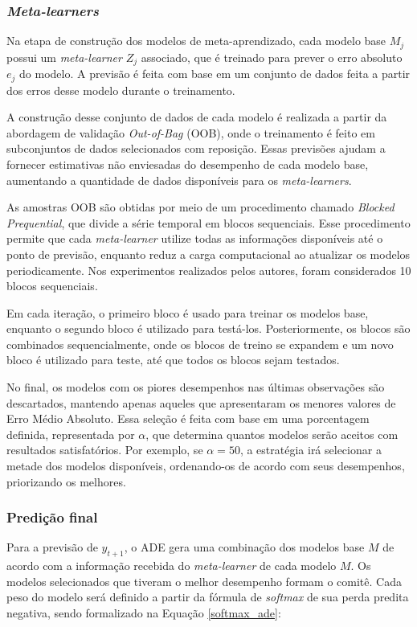 \subsubsection{\textit{Meta-learners}}

Na etapa de construção dos modelos de meta-aprendizado, cada modelo base \( M_j \) possui um \textit{meta-learner} \( Z_j \) associado, que é treinado para prever o erro absoluto \( e_j \) do modelo. A previsão é feita com base em um conjunto de dados feita a partir dos erros desse modelo durante o treinamento.

A construção desse conjunto de dados de cada modelo é realizada a partir da abordagem de validação \textit{Out-of-Bag} (OOB), onde o treinamento é feito em subconjuntos de dados selecionados com reposição. Essas previsões ajudam a fornecer estimativas não enviesadas do desempenho de cada modelo base, aumentando a quantidade de dados disponíveis para os \textit{meta-learners}.

As amostras OOB são obtidas por meio de um procedimento chamado \textit{Blocked Prequential}, que divide a série temporal em blocos sequenciais. Esse procedimento permite que cada \textit{meta-learner} utilize todas as informações disponíveis até o ponto de previsão, enquanto reduz a carga computacional ao atualizar os modelos periodicamente. Nos experimentos realizados pelos autores, foram considerados 10 blocos sequenciais.

Em cada iteração, o primeiro bloco é usado para treinar os modelos base, enquanto o segundo bloco é utilizado para testá-los. Posteriormente, os blocos são combinados sequencialmente, onde os blocos de treino se expandem e um novo bloco é utilizado para teste, até que todos os blocos sejam testados.

No final, os modelos com os piores desempenhos nas últimas observações são descartados, mantendo apenas aqueles que apresentaram os menores valores de Erro  Médio Absoluto. Essa seleção é feita com base em uma porcentagem definida, representada por $\alpha$, que determina quantos modelos serão aceitos com resultados satisfatórios. Por exemplo, se $\alpha = 50$, a estratégia irá selecionar a metade dos modelos disponíveis, ordenando-os de acordo com seus desempenhos, priorizando os melhores.

\subsubsection{Predição final}

Para a previsão de \( y_{t+1} \), o ADE gera uma combinação dos modelos base \( M \) de acordo com a informação recebida do \textit{meta-learner} de cada modelo \( M \). Os modelos selecionados que tiveram o melhor desempenho formam o comitê. Cada peso do modelo será definido a partir da fórmula de \textit{softmax} de sua perda predita negativa, sendo formalizado na Equação \eqref{softmax_ade}:

